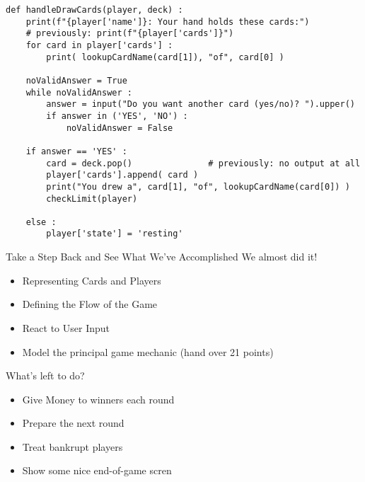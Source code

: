 \begin{frame}[fragile]
%
\begin{codebox}
\begin{verbatim}
def handleDrawCards(player, deck) :
    print(f"{player['name']}: Your hand holds these cards:")
    # previously: print(f"{player['cards']}")
    for card in player['cards'] :
        print( lookupCardName(card[1]), "of", card[0] )
    
    noValidAnswer = True
    while noValidAnswer :
        answer = input("Do you want another card (yes/no)? ").upper()
        if answer in ('YES', 'NO') :
            noValidAnswer = False
    
    if answer == 'YES' :
        card = deck.pop()               # previously: no output at all
        player['cards'].append( card )
        print("You drew a", card[1], "of", lookupCardName(card[0]) )
        checkLimit(player)
        
    else :
        player['state'] = 'resting'
\end{verbatim}
\end{codebox}
%
\end{frame}


\begin{frame}{Take a Step Back and See What We've Accomplished}
%
We almost did it!
\begin{itemize}
\item Representing Cards and Players
\item Defining the Flow of the Game
\item React to User Input
\item Model the principal game mechanic (hand over 21 points)
\end{itemize}

What's left to do?
\begin{itemize}
\item Give Money to winners each round
\item Prepare the next round
\item Treat bankrupt players
\item Show some nice end-of-game scren
\end{itemize}
%
\end{frame}


